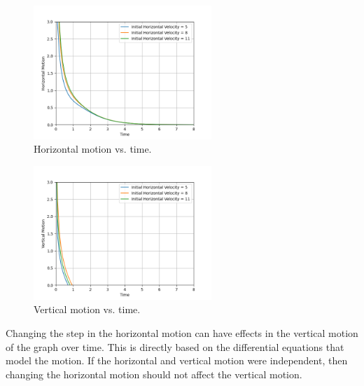 \documentclass[12pt]{iopart} %
\begin{document}
\begin{figure}[h!tbp]
  \begin{center}
 \item[]\includegraphics[width=0.6\textwidth]{figure1.png}
  \caption{\label{fig:figure1}
  Horizontal motion vs. time.
  }
  \end{center}
\end{figure}

\begin{figure}[h!tbp]
  \begin{center}
 \item[]\includegraphics[width=0.6\textwidth]{figure2.png}
  \caption{\label{fig:figure2}
  Vertical motion vs. time.
  }
  \end{center}
\end{figure}

Changing the step in the horizontal motion can have effects in the vertical motion of the graph over time. 
This is directly based on the differential equations that model the motion. 
If the horizontal and vertical motion were independent, then changing the horizontal motion should not affect the vertical motion.

\pagebreak

\begin{center}
\subtitle{\textbf{Trajectories}}
\end{center}
\end{document}
